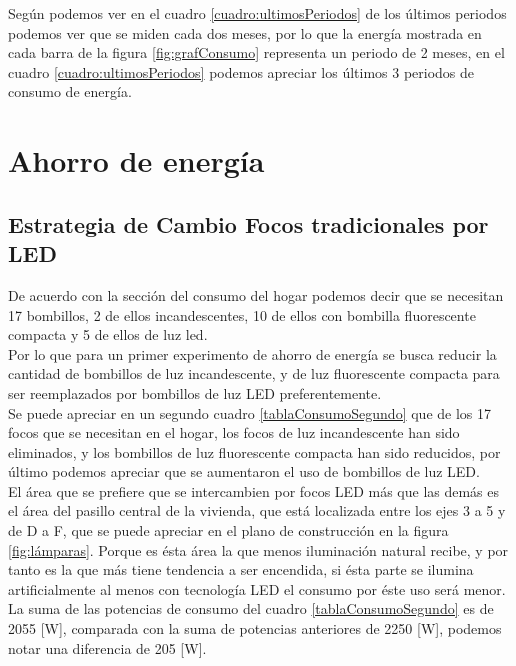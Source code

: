 \documentclass[]{article}
\begin{document}
Según podemos ver en el cuadro \ref{cuadro:ultimosPeriodos} de los últimos periodos podemos ver que se miden cada dos meses, por lo que la energía mostrada en cada barra de la figura \ref{fig:grafConsumo} representa un periodo de 2 meses, en el cuadro \ref{cuadro:ultimosPeriodos} podemos apreciar los últimos 3 periodos de consumo de energía.\\



\section{Ahorro de energía}



\subsection{Estrategia de Cambio Focos tradicionales por LED}

De acuerdo con la sección del consumo del hogar podemos decir que se necesitan 17 bombillos, 2 de ellos incandescentes, 10 de ellos con bombilla fluorescente compacta y 5 de ellos de luz led.\\

Por lo que para un primer experimento de ahorro de energía se busca reducir la cantidad de bombillos de luz incandescente, y de luz fluorescente compacta para ser reemplazados por bombillos de luz LED preferentemente.\\

Se puede apreciar en un segundo cuadro \ref{tablaConsumoSegundo} que de los 17 focos que se necesitan en el hogar, los focos de luz incandescente han sido eliminados, y los bombillos de luz fluorescente compacta han sido reducidos, por último podemos apreciar que se aumentaron el uso de bombillos de luz LED.\\

El área que se prefiere que se intercambien por focos LED más que las demás es el área del pasillo central de la vivienda, que está localizada entre los ejes 3 a 5 y de D a F, que se puede apreciar en el plano de construcción en la figura \ref{fig:lámparas}. Porque es ésta área la que menos iluminación natural recibe, y por tanto es la que más tiene tendencia a ser encendida, si ésta parte se ilumina artificialmente al menos con tecnología LED el consumo por éste uso será menor.\\

La suma de las potencias de consumo del cuadro \ref{tablaConsumoSegundo} es de 2055 [W], comparada con la suma de potencias anteriores de 2250 [W], podemos notar una diferencia de 205 [W].\\
\end{document}
